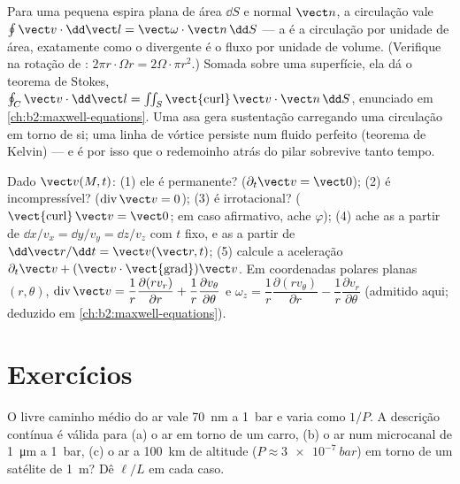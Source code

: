 \begin{remark}\label{rem:b2:fluid-kinematics:stokes}
Para uma pequena espira plana de área $\dd S$ e normal $\vect n$, a
circulação vale $\oint\vect v\cdot\dd\vect l = \vect\omega\cdot\vect n\,\dd S$ ---
a  é a circulação por unidade de área, exatamente como o
divergente é o fluxo por unidade de volume. (Verifique na rotação de
: $2\pi r\cdot\Omega r = 2\Omega\cdot\pi r^2$.) Somada sobre uma superfície,
ela dá o teorema de Stokes, $\oint_C\vect v\cdot\dd\vect l = \iint_S
\operatorname{\vect{curl}}\vect v\cdot\vect n\,\dd S$, enunciado em
\cref{ch:b2:maxwell-equations}. Uma asa gera sustentação carregando uma
circulação em torno de si; uma linha de vórtice persiste num fluido perfeito
(teorema de Kelvin) --- e é por isso que o redemoinho atrás do pilar sobrevive
tanto tempo.
\end{remark}

\begin{method}\label{met:b2:fluid-kinematics:reading}
Dado $\vect v(M, t)$: (1) ele é permanente? ($\partial_t\vect v = \vect 0$); (2)
é incompressível? ($\operatorname{div}\vect v = 0$); (3) é
irrotacional? ($\operatorname{\vect{curl}}\vect v = \vect 0$; em caso afirmativo, ache
$\varphi$); (4) ache as  a partir de $\dd x/v_x = \dd y/v_y = \dd z/
v_z$ com $t$ fixo, e as  a partir de $\dd\vect r/\dd t = \vect v(\vect r,
t)$; (5) calcule a aceleração $\partial_t\vect v + (\vect v\cdot
\operatorname{\vect{grad}})\vect v$. Em coordenadas polares planas $(r, \theta)$,
$\operatorname{div}\vect v = \dfrac1r\dfrac{\partial(rv_r)}{\partial r} + \dfrac1r
\dfrac{\partial v_\theta}{\partial\theta}$ e $\omega_z = \dfrac1r\dfrac{\partial(rv_\theta)}
{\partial r} - \dfrac1r\dfrac{\partial v_r}{\partial\theta}$ (admitido aqui; deduzido
em \cref{ch:b2:maxwell-equations}).
\end{method}

\section{Exercícios}

\begin{exercise}[$\star$]\label{exo:b2:fluid-kinematics:1}
O livre caminho médio do ar vale \qty{70}{nm} a \qty{1}{bar} e varia como
$1/P$. A descrição contínua é válida para (a) o ar em torno de um carro,
(b) o ar num microcanal de \qty{1}{\micro m} a \qty{1}{bar}, (c) o ar a
\qty{100}{km} de altitude ($P \approx \qty{3e-7}{bar}$) em torno de um satélite de
\qty{1}{m}? Dê $\ell/L$ em cada caso.
\end{exercise}

